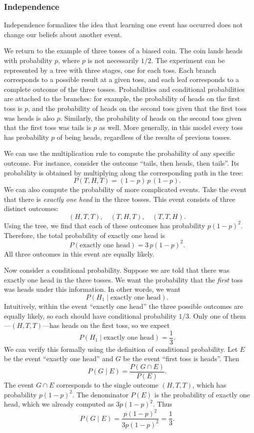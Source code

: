 \subsubsection{Independence}

Independence formalizes the idea that learning one event has occurred does not change our beliefs about another event.

We return to the example of three tosses of a biased coin. The coin lands heads with probability \(p\), where \(p\) is not necessarily \(1/2\). The experiment can be represented by a tree with three stages, one for each toss. Each branch corresponds to a possible result at a given toss, and each leaf corresponds to a complete outcome of the three tosses. Probabilities and conditional probabilities are attached to the branches: for example, the probability of heads on the first toss is \(p\), and the probability of heads on the second toss given that the first toss was heads is also \(p\). Similarly, the probability of heads on the second toss given that the first toss was tails is \(p\) as well. More generally, in this model every toss has probability \(p\) of being heads, regardless of the results of previous tosses.

We can use the multiplication rule to compute the probability of any specific outcome. For instance, consider the outcome “tails, then heads, then tails”. Its probability is obtained by multiplying along the corresponding path in the tree:
\[
P(T,H,T) = (1-p)\,p\,(1-p).
\]
We can also compute the probability of more complicated events. Take the event that there is \textit{exactly one head} in the three tosses. This event consists of three distinct outcomes:
\[
(H,T,T), \quad (T,H,T), \quad (T,T,H).
\]
Using the tree, we find that each of these outcomes has probability \(p(1-p)^2\). Therefore, the total probability of exactly one head is
\[
P(\text{exactly one head}) = 3\,p(1-p)^2.
\]
All three outcomes in this event are equally likely.

Now consider a conditional probability. Suppose we are told that there was exactly one head in the three tosses. We want the probability that the \textit{first} toss was heads under this information. In other words, we want
\[
P(H_1 \mid \text{exactly one head}).
\]
Intuitively, within the event “exactly one head” the three possible outcomes are equally likely, so each should have conditional probability \(1/3\). Only one of them—\((H,T,T)\)—has heads on the first toss, so we expect
\[
P(H_1 \mid \text{exactly one head}) = \frac{1}{3}.
\]
We can verify this formally using the definition of conditional probability. Let \(E\) be the event “exactly one head” and \(G\) be the event “first toss is heads”. Then
\[
P(G \mid E) = \frac{P(G \cap E)}{P(E)}.
\]
The event \(G \cap E\) corresponds to the single outcome \((H,T,T)\), which has probability \(p(1-p)^2\). The denominator \(P(E)\) is the probability of exactly one head, which we already computed as \(3p(1-p)^2\). Thus
\[
P(G \mid E) = \frac{p(1-p)^2}{3p(1-p)^2} = \frac{1}{3}.
\]

